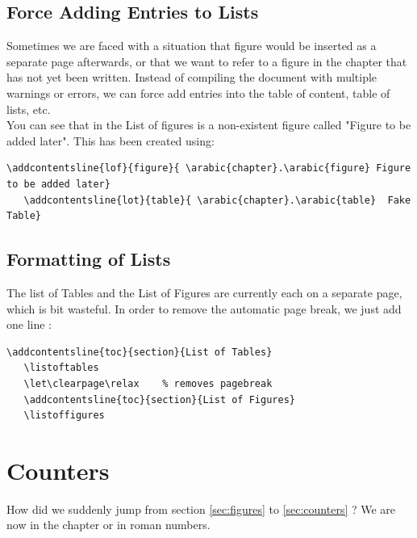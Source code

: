 \documentclass[a4paper,10pt]{report} %
\begin{document}
  \subsection{Force Adding Entries to Lists}
  Sometimes we are faced with a situation that figure would be inserted as a separate page afterwards, or that we want to refer to a figure in the chapter that has not yet been written. Instead of compiling the document with multiple warnings or errors, we can force add entries into the table of content, table of lists, etc.\\
  
  You can see that in the List of figures is a non-existent figure called "Figure to be added later". This has been created using: 
  
  
   \begin{lstlisting}[language={[latex]tex},
    frame=single,
    basicstyle=\footnotesize\color{darkgray}, 
    keywordstyle=\bf\color{magenta},
    commentstyle=\color{ForestGreen},  %
    breaklines=true
   ]
   \addcontentsline{lof}{figure}{ \arabic{chapter}.\arabic{figure} Figure to be added later}
   \addcontentsline{lot}{table}{ \arabic{chapter}.\arabic{table}  Fake Table}
\end{lstlisting}

\subsection{Formatting of Lists}

The list of Tables and the List of Figures are currently each on a separate page, which is bit wasteful. In order to remove the automatic page break, we just add one line : 
\begin{lstlisting}[language={[latex]tex}, 
  frame=single,
  basicstyle=\footnotesize\color{darkgray}, 
  keywordstyle=\bf\color{magenta},
  commentstyle=\color{ForestGreen},  %
  breaklines=true
  ]
   \addcontentsline{toc}{section}{List of Tables}
   \listoftables  
   \let\clearpage\relax    % removes pagebreak                       
   \addcontentsline{toc}{section}{List of Figures}  
   \listoffigures
\end{lstlisting}

 \setcounter{section}{1}
 \section{Counters}%
How did we suddenly jump from section \ref{sec:figures} to \ref{sec:counters}  ? We are now in the chapter  or  in roman numbers.\\
\end{document}
